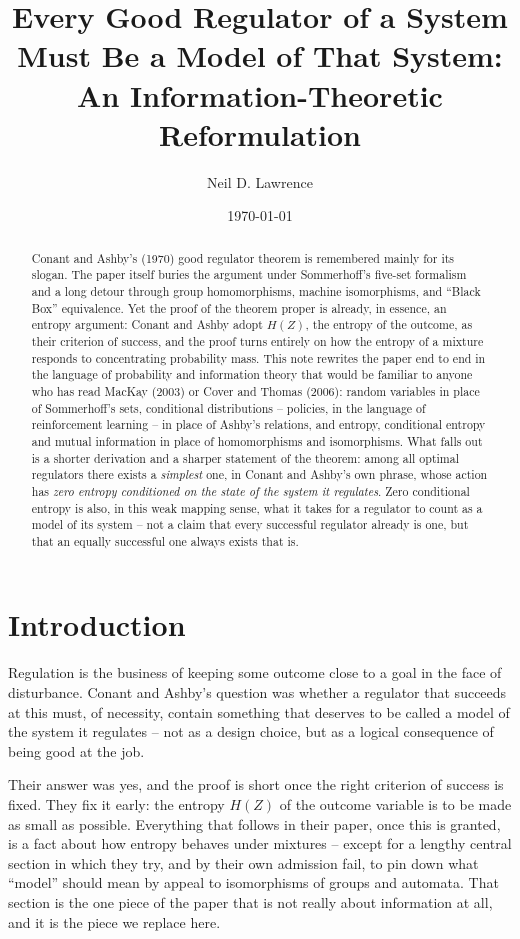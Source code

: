 \documentclass[11pt]{article}
\title{Every Good Regulator of a System Must Be a Model of That System: 
\large An Information-Theoretic Reformulation}
\author{Neil D. Lawrence}
\date{\today}
\theoremstyle{definition}
\theoremstyle{remark}
\begin{document}
\maketitle

\begin{abstract}
Conant and Ashby's (1970) good regulator theorem is remembered mainly for its
slogan. The paper itself buries the argument under Sommerhoff's five-set
formalism and a long detour through group homomorphisms, machine
isomorphisms, and ``Black Box'' equivalence. Yet the proof of the theorem
proper is already, in essence, an entropy argument: Conant and Ashby adopt
$H(Z)$, the entropy of the outcome, as their criterion of success, and the
proof turns entirely on how the entropy of a mixture responds to
concentrating probability mass. This note rewrites the paper end to end in
the language of probability and information theory that would be familiar
to anyone who has read MacKay (2003) or Cover and Thomas (2006): random
variables in place of Sommerhoff's sets, conditional distributions --
policies, in the language of reinforcement learning -- in place of Ashby's
relations, and entropy, conditional entropy and mutual information in place
of homomorphisms and isomorphisms. What falls out is a shorter derivation
and a sharper statement of the theorem: among all optimal regulators there
exists a \emph{simplest} one, in Conant and Ashby's own phrase, whose
action has \emph{zero entropy conditioned on the state of the system it
regulates}. Zero conditional entropy is also, in this weak mapping sense,
what it takes for a regulator to count as a model of its system -- not a
claim that every successful regulator already is one, but that an equally
successful one always exists that is.
\end{abstract}

\section{Introduction}

Regulation is the business of keeping some outcome close to a goal in the
face of disturbance. Conant and Ashby's question was whether a regulator
that succeeds at this must, of necessity, contain something that deserves
to be called a model of the system it regulates -- not as a design choice,
but as a logical consequence of being good at the job.

Their answer was yes, and the proof is short once the right criterion of
success is fixed. They fix it early: the entropy $H(Z)$ of the outcome
variable is to be made as small as possible. Everything that follows in
their paper, once this is granted, is a fact about how entropy behaves
under mixtures -- except for a lengthy central section in which they try,
and by their own admission fail, to pin down what ``model'' should mean by
appeal to isomorphisms of groups and automata. That section is the one
piece of the paper that is not really about information at all, and it is
the piece we replace here.
\end{document}
